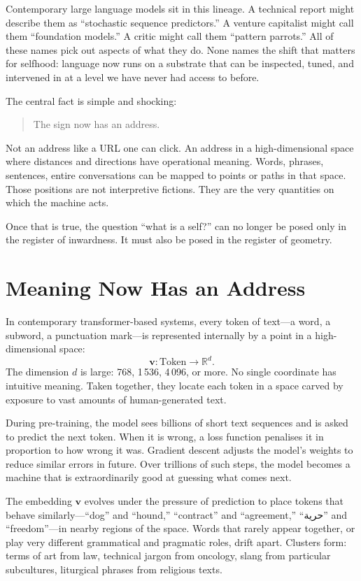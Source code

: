 \documentclass[12pt,a4paper]{report}
\begin{document}
Contemporary large language models sit in this lineage. A technical report might describe them as ``stochastic sequence predictors.'' A venture capitalist might call them ``foundation models.'' A critic might call them ``pattern parrots.'' All of these names pick out aspects of what they do. None names the shift that matters for selfhood: language now runs on a substrate that can be inspected, tuned, and intervened in at a level we have never had access to before.

The central fact is simple and shocking:

\begin{quote}
The sign now has an address.
\end{quote}

Not an address like a URL one can click. An address in a high-dimensional space where distances and directions have operational meaning. Words, phrases, sentences, entire conversations can be mapped to points or paths in that space. Those positions are not interpretive fictions. They are the very quantities on which the machine acts.

Once that is true, the question ``what is a self?'' can no longer be posed only in the register of inwardness. It must also be posed in the register of geometry.

\section{Meaning Now Has an Address}

In contemporary transformer-based systems, every token of text---a word, a subword, a punctuation mark---is represented internally by a point in a high-dimensional space:
\[
\mathbf{v} : \text{Token} \rightarrow \mathbb{R}^{d}.
\]
The dimension $d$ is large: 768, 1\,536, 4\,096, or more. No single coordinate has intuitive meaning. Taken together, they locate each token in a space carved by exposure to vast amounts of human-generated text.

During pre-training, the model sees billions of short text sequences and is asked to predict the next token. When it is wrong, a loss function penalises it in proportion to how wrong it was. Gradient descent adjusts the model's weights to reduce similar errors in future. Over trillions of such steps, the model becomes a machine that is extraordinarily good at guessing what comes next.

The embedding $\mathbf{v}$ evolves under the pressure of prediction to place tokens that behave similarly---``dog'' and ``hound,'' ``contract'' and ``agreement,'' ``\textarabic{حرية}'' and ``freedom''---in nearby regions of the space. Words that rarely appear together, or play very different grammatical and pragmatic roles, drift apart. Clusters form: terms of art from law, technical jargon from oncology, slang from particular subcultures, liturgical phrases from religious texts.
\end{document}

